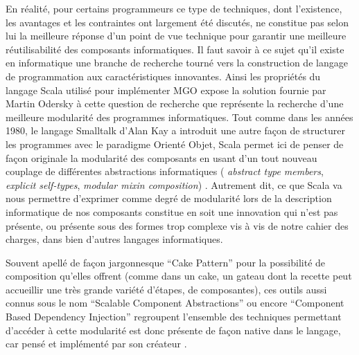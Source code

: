 En réalité, pour certains programmeurs \textcite{Odersky2005}  ce type de techniques, dont l'existence, les avantages et les contraintes ont largement été discutés, ne constitue pas selon lui la meilleure réponse d'un point de vue technique pour garantir une meilleure réutilisabilité des composants informatiques. Il faut savoir à ce sujet qu'il existe en informatique une branche de recherche tourné vers la construction de langage de programmation aux caractéristiques innovantes. Ainsi les propriétés du langage Scala utilisé pour implémenter MGO expose la solution fournie par Martin Odersky à cette question de recherche que représente la recherche d'une meilleure modularité des programmes informatiques. Tout comme dans les années 1980, le langage Smalltalk d'Alan Kay a introduit une autre façon de structurer les programmes avec le paradigme Orienté Objet, Scala permet ici de penser de façon originale la modularité des composants en usant d'un tout nouveau couplage de différentes abstractions informatiques ( \textit{abstract type members}, \textit{explicit self-types}, \textit{modular mixin composition}) . Autrement dit, ce que Scala va nous permettre d'exprimer comme degré de modularité lors de la description informatique de nos composants constitue en soit une innovation qui n'est pas présente, ou présente sous des formes trop complexe vis à vis de notre cahier des charges, dans bien d'autres langages informatiques.




Souvent apellé de façon jargonnesque \foreignquote{english}{Cake Pattern} pour la possibilité de composition qu'elles offrent (comme dans un cake, un gateau dont la recette peut accueillir une très grande variété d'étapes, de composantes), ces outils aussi connus sous le nom \foreignquote{english}{Scalable Component Abstractions} ou encore \foreignquote{english}{Component Based Dependency Injection} regroupent  l'ensemble des techniques permettant d'accéder à cette modularité est donc présente de façon native dans le langage, car pensé et implémenté par son créateur \autocite{Oderskyxx}.


